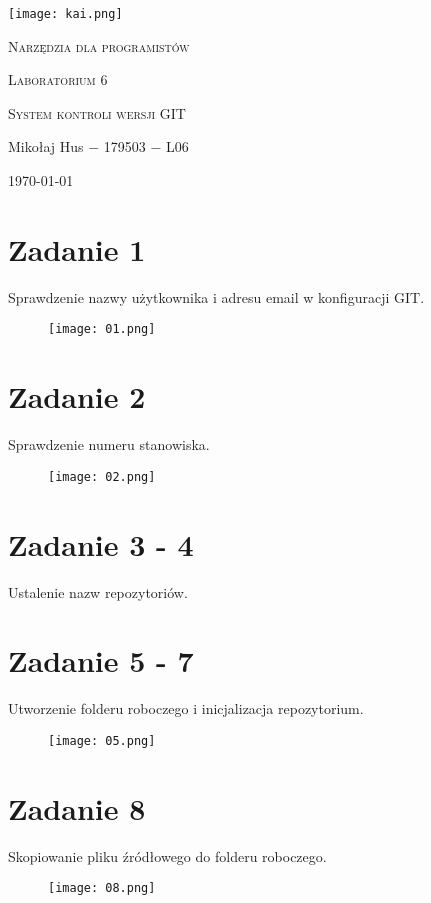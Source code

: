 \documentclass[fleqn,onecolumn,a4paper,12pt,titlepage]{article}
\begin{document}
\begin{titlepage}
    \texttt{[image: kai.png]}\par\vspace{3cm}
    \centering
    {\LARGE \textsc{Narzędzia dla programistów} \par}
    \vspace{2cm}
    {\Large \textsc{Laboratorium 6} \par} %
    \vspace{2cm}
    {\textsc{System kontroli wersji GIT} \par} %
    \vfill
    Mikołaj Hus $-$ 179503 $-$ L06 \par %
    \vspace{2cm}
    {\large {\today} \par}
\end{titlepage}

\section*{Zadanie 1}
Sprawdzenie nazwy użytkownika i adresu email w konfiguracji GIT.
\begin{figure}[H]%
    \centering\texttt{[image: 01.png]}
\end{figure}

\section*{Zadanie 2}
Sprawdzenie numeru stanowiska.
\begin{figure}[H]%
    \centering\texttt{[image: 02.png]}
\end{figure}

\section*{Zadanie 3 - 4}
Ustalenie nazw repozytoriów.


\section*{Zadanie 5 - 7}
Utworzenie folderu roboczego i inicjalizacja repozytorium.
\begin{figure}[H]%
    \centering\texttt{[image: 05.png]}
\end{figure}

\section*{Zadanie 8}
Skopiowanie pliku źródłowego do folderu roboczego.
\begin{figure}[H]%
    \centering\texttt{[image: 08.png]}
\end{figure}
\end{document}
